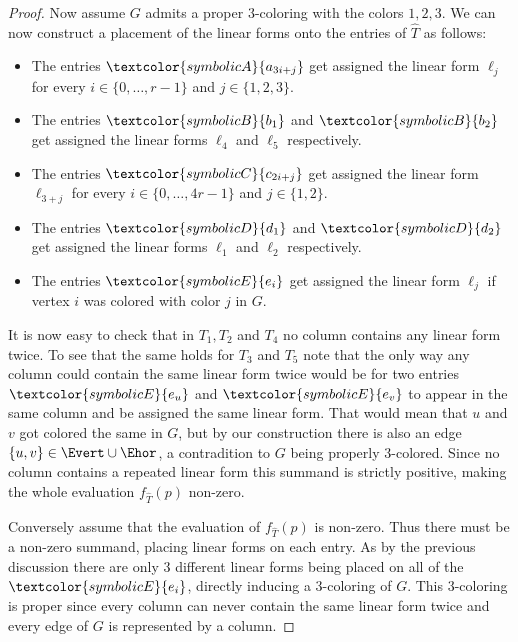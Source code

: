 \begin{proof}
    Now assume $G$ admits a proper $3$-coloring with the colors $1,2,3$.
    We can now construct a placement of the linear forms onto the entries of $\hat{T}$ as follows:
    \begin{itemize}
        \item The entries $\textcolor{symbolicA}{a_{3i+j}}$ get assigned the linear form $\ell_j$ for every $i \in \{0, \ldots, r-1\}$ and $j \in \{1, 2, 3\}$.
        \item The entries $\textcolor{symbolicB}{b_1}$ and $\textcolor{symbolicB}{b_2}$ get assigned the linear forms $\ell_4$ and $\ell_5$ respectively.
        \item The entries $\textcolor{symbolicC}{c_{2i+j}}$ get assigned the linear form $\ell_{3+j}$ for every $i \in \{0, \ldots, 4r-1\}$ and $j \in \{1, 2\}$.
        \item The entries $\textcolor{symbolicD}{d_1}$ and $\textcolor{symbolicD}{d_2}$ get assigned the linear forms $\ell_1$ and $\ell_2$ respectively.
        \item The entries $\textcolor{symbolicE}{e_i}$ get assigned the linear form $\ell_j$ if vertex $i$ was colored with color $j$ in $G$.
    \end{itemize}
    It is now easy to check that in $T_1, T_2$ and $T_4$ no column contains any linear form twice.
    To see that the same holds for $T_3$ and $T_5$ note that the only way any column could contain the same linear form twice would be for two entries $\textcolor{symbolicE}{e_u}$ and $\textcolor{symbolicE}{e_v}$ to appear in the same column and be assigned the same linear form.
    That would mean that $u$ and $v$ got colored the same in $G$, but by our construction there is also an edge $\{u, v\} \in \Evert \cup \Ehor$, a contradition to $G$ being properly $3$-colored.
    Since no column contains a repeated linear form this summand is strictly positive, making the whole evaluation $f_{\hat{T}}(p)$ non-zero.

    Conversely assume that the evaluation of $f_{\hat{T}}(p)$ is non-zero.
    Thus there must be a non-zero summand, placing linear forms on each entry.
    As by the previous discussion there are only $3$ different linear forms being placed on all of the $\textcolor{symbolicE}{e_i}$, directly inducing a $3$-coloring of $G$.
    This $3$-coloring is proper since every column can never contain the same linear form twice and every edge of $G$ is represented by a column.


\end{proof}
